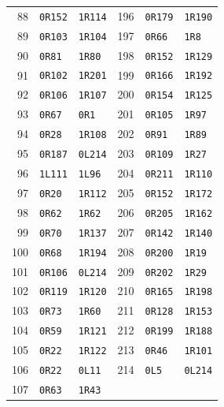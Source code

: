 \begin{longtable}{rll@{\hspace{2em}}rll}
88 & \texttt{0R152} & \texttt{1R114} & 196 & \texttt{0R179} & \texttt{1R190}\\
89 & \texttt{0R103} & \texttt{1R104} & 197 & \texttt{0R66} & \texttt{1R8}\\
90 & \texttt{0R81} & \texttt{1R80} & 198 & \texttt{0R152} & \texttt{1R129}\\
91 & \texttt{0R102} & \texttt{1R201} & 199 & \texttt{0R166} & \texttt{1R192}\\
92 & \texttt{0R106} & \texttt{1R107} & 200 & \texttt{0R154} & \texttt{1R125}\\
93 & \texttt{0R67} & \texttt{0R1} & 201 & \texttt{0R105} & \texttt{1R97}\\
94 & \texttt{0R28} & \texttt{1R108} & 202 & \texttt{0R91} & \texttt{1R89}\\
95 & \texttt{0R187} & \texttt{0L214} & 203 & \texttt{0R109} & \texttt{1R27}\\
96 & \texttt{1L111} & \texttt{1L96} & 204 & \texttt{0R211} & \texttt{1R110}\\
97 & \texttt{0R20} & \texttt{1R112} & 205 & \texttt{0R152} & \texttt{1R172}\\
98 & \texttt{0R62} & \texttt{1R62} & 206 & \texttt{0R205} & \texttt{1R162}\\
99 & \texttt{0R70} & \texttt{1R137} & 207 & \texttt{0R142} & \texttt{1R140}\\
100 & \texttt{0R68} & \texttt{1R194} & 208 & \texttt{0R200} & \texttt{1R19}\\
101 & \texttt{0R106} & \texttt{0L214} & 209 & \texttt{0R202} & \texttt{1R29}\\
102 & \texttt{0R119} & \texttt{1R120} & 210 & \texttt{0R165} & \texttt{1R198}\\
103 & \texttt{0R73} & \texttt{1R60} & 211 & \texttt{0R128} & \texttt{1R153}\\
104 & \texttt{0R59} & \texttt{1R121} & 212 & \texttt{0R199} & \texttt{1R188}\\
105 & \texttt{0R22} & \texttt{1R122} & 213 & \texttt{0R46} & \texttt{1R101}\\
106 & \texttt{0R22} & \texttt{0L11} & 214 & \texttt{0L5} & \texttt{0L214}\\
107 & \texttt{0R63} & \texttt{1R43} &  &  & \\
\end{longtable}
\endgroup
